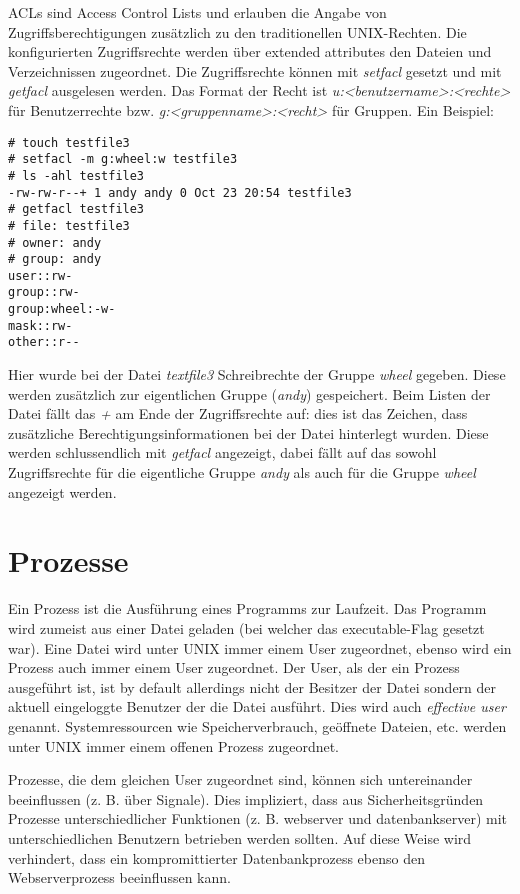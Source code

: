 ACLs sind Access Control Lists und erlauben die Angabe von Zugriffsberechtigungen zusätzlich zu den traditionellen UNIX-Rechten. Die konfigurierten Zugriffsrechte werden über extended attributes den Dateien und Verzeichnissen zugeordnet. Die Zugriffsrechte können mit \textit{setfacl} gesetzt und mit \textit{getfacl} ausgelesen werden. Das Format der Recht ist \textit{u:<benutzername>:<rechte>} für Benutzerrechte bzw. \textit{g:<gruppenname>:<recht>} für Gruppen. Ein Beispiel:

\begin{verbatim}
# touch testfile3
# setfacl -m g:wheel:w testfile3
# ls -ahl testfile3  
-rw-rw-r--+ 1 andy andy 0 Oct 23 20:54 testfile3
# getfacl testfile3
# file: testfile3
# owner: andy
# group: andy
user::rw-
group::rw-
group:wheel:-w-
mask::rw-
other::r--

\end{verbatim}

Hier wurde bei der Datei \textit{textfile3} Schreibrechte der Gruppe \textit{wheel} gegeben. Diese werden zusätzlich zur eigentlichen Gruppe (\textit{andy}) gespeichert. Beim Listen der Datei fällt das \textit{+} am Ende der Zugriffsrechte auf: dies ist das Zeichen, dass zusätzliche Berechtigungsinformationen bei der Datei hinterlegt wurden. Diese werden schlussendlich mit  \textit{getfacl} angezeigt, dabei fällt auf das sowohl Zugriffsrechte für die eigentliche Gruppe \textit{andy} als auch für die Gruppe \textit{wheel} angezeigt werden.

\section{Prozesse}

Ein Prozess ist die Ausführung eines Programms zur Laufzeit. Das Programm wird zumeist aus einer Datei geladen (bei welcher das executable-Flag gesetzt war). Eine Datei wird unter UNIX immer einem User zugeordnet, ebenso wird ein Prozess auch immer einem User zugeordnet. Der User, als der ein Prozess ausgeführt ist, ist by default allerdings nicht der Besitzer der Datei sondern der aktuell eingeloggte Benutzer der die Datei ausführt. Dies wird auch \textit{effective user} genannt. Systemressourcen wie Speicherverbrauch, geöffnete Dateien, etc. werden unter UNIX immer einem offenen Prozess zugeordnet.

Prozesse, die dem gleichen User zugeordnet sind, können sich untereinander beeinflussen (z. B. über Signale). Dies impliziert, dass aus Sicherheitsgründen Prozesse unterschiedlicher Funktionen (z. B. webserver und datenbankserver) mit unterschiedlichen Benutzern betrieben werden sollten. Auf diese Weise wird verhindert, dass ein kompromittierter Datenbankprozess ebenso den Webserverprozess beeinflussen kann.

